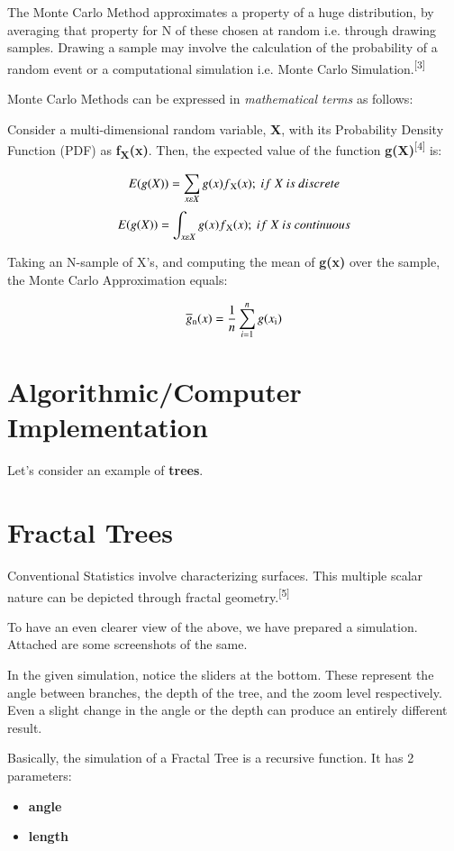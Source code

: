 \documentclass{resonance}
\begin{document}
The Monte Carlo Method approximates a property of a huge distribution, by averaging that property for N of these chosen at random i.e. through drawing samples. Drawing a sample may involve the calculation of the probability of a random event or a computational simulation i.e. Monte Carlo Simulation.\textsuperscript{[3]}

Monte Carlo Methods can be expressed in \textit{mathematical terms} as follows:

Consider a multi-dimensional random variable, \textbf{X}, with its Probability Density Function (PDF) as \textbf{f\textsubscript{X}(x)}. Then, the expected value of the function \textbf{g(X)}\textsuperscript{[4]} is:

$$E(g(X)) = \sum_{x\varepsilon X} g(x)f\textsubscript{X}(x);\ if\ X\ is\ discrete$$
$$E(g(X)) = \int_{x\varepsilon X} g(x)f\textsubscript{X}(x);\ if\ X\ is\ continuous$$

Taking an N-sample of X’s, and computing the mean of \textbf{g(x)} over the sample, the Monte Carlo Approximation equals:

$$ \overline{g}\textsubscript{n}(x) = \frac{1}{n} \sum_{i=1}^{n}g(x\textsubscript{i}) $$

\section*{Algorithmic/Computer Implementation}
Let's consider an example of \textbf{trees}.


\setlength{\leftskip}{0cm}
\section{Fractal Trees}

Conventional Statistics involve characterizing surfaces. This multiple scalar nature can be depicted through fractal geometry.\textsuperscript{[5]}

To have an even clearer view of the above, we have prepared a simulation. Attached are some screenshots of the same.

In the given simulation, notice the sliders at the bottom. These represent the angle between branches, the depth of the tree, and the zoom level respectively. Even a slight change in the angle or the depth can produce an entirely different result.

Basically, the simulation of a Fractal Tree is a recursive function. It has 2 parameters:
\begin{itemize}
    \item \textbf{angle}
    \item \textbf{length}
\end{itemize}
\end{document}
